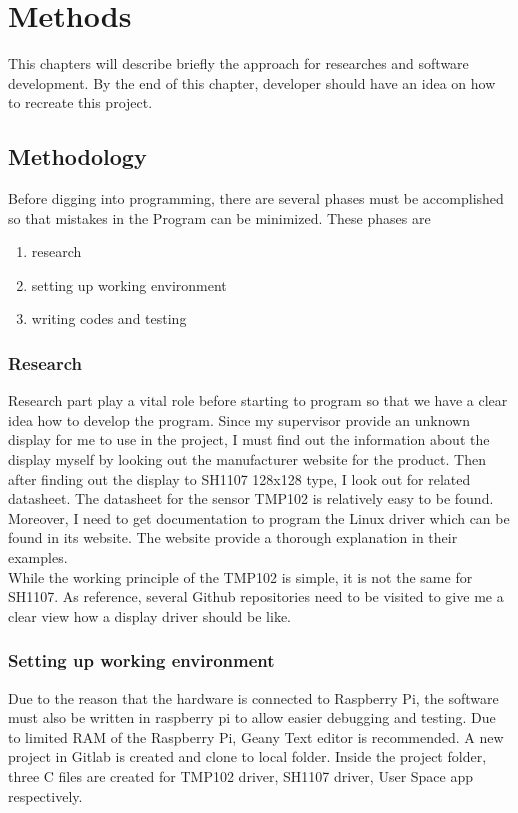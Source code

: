 \chapter{Methods}
This chapters will describe briefly the approach for researches and software development. By the end of this chapter, developer should have an idea on how to recreate this project.

\section{Methodology}
Before digging into programming, there are several phases must be accomplished so that mistakes in the Program can be minimized. These phases are 
\begin{enumerate}
	\item research
	\item setting up working environment
	\item writing codes and testing
\end{enumerate}

\subsection{Research}
Research part play a vital role before starting to program so that we have a clear idea how to develop the program. Since my supervisor provide an unknown display for me to use in the project, I must find out the information about the display myself by looking out the manufacturer website for the product. Then after finding out the display to SH1107 128x128 type, I look out for related datasheet. The datasheet for the sensor TMP102 is relatively easy to be found. \\
Moreover, I need to get documentation to program the Linux driver which can be found in its website. The website provide a thorough explanation in their examples.\\
While the working principle of the TMP102 is simple, it is not the same for SH1107. As reference, several Github repositories need to be visited to give me a clear view how a display driver should be like.

\subsection{Setting up working environment}
Due to the reason that the hardware is connected to Raspberry Pi, the software must also be written in raspberry pi to allow easier debugging and testing. Due to limited RAM of the Raspberry Pi, Geany Text editor is recommended. A new project in Gitlab is created and clone to local folder. Inside the project folder, three C files are created for TMP102 driver, SH1107 driver, User Space app respectively.

